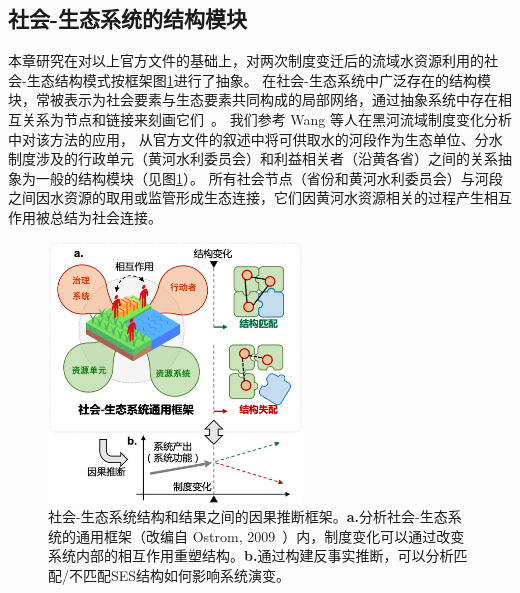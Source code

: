 \subsection{社会-生态系统的结构模块}\label{sec:structures}

本章研究在对以上官方文件的基础上，对两次制度变迁后的流域水资源利用的社会-生态结构模式按框架图\ref{fig:framework}进行了抽象。
在社会-生态系统中广泛存在的结构模块，常被表示为社会要素与生态要素共同构成的局部网络，通过抽象系统中存在相互关系为节点和链接来刻画它们~\cite{bodin2017a,kluger2020,guerrero2015}。
我们参考 Wang 等人在黑河流域制度变化分析中对该方法的应用\cite{wang2019d}，
从官方文件的叙述中将可供取水的河段作为生态单位、分水制度涉及的行政单元（黄河水利委员会）和利益相关者（沿黄各省）之间的关系抽象为一般的结构模块（见图\ref{fig:framework}）。
所有社会节点（省份和黄河水利委员会）与河段之间因水资源的取用或监管形成生态连接，它们因黄河水资源相关的过程产生相互作用被总结为社会连接。

\begin{figure}[!htb] %
    \centering
    \includegraphics[width=0.6\textwidth]{img/ch5/ch5_framework.png}
    \caption[社会-生态系统结构和结果之间的因果推断框架]{社会-生态系统结构和结果之间的因果推断框架。\textbf{a.}分析社会-生态系统的通用框架（改编自 Ostrom, 2009~\cite{ostrom2009}）内，制度变化可以通过改变系统内部的相互作用重塑结构。\textbf{b.}通过构建反事实推断，可以分析匹配/不匹配SES结构如何影响系统演变。}\label{fig:framework}
\end{figure}

